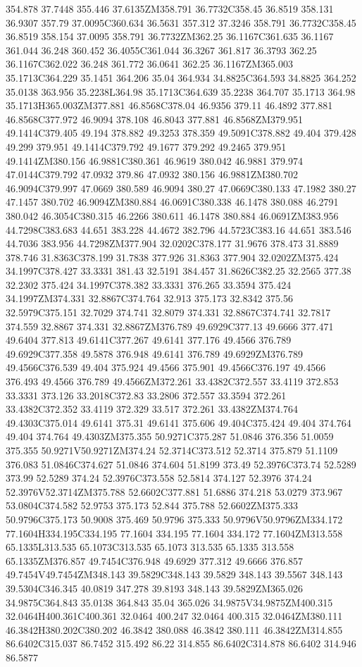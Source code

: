 354.878 37.7448 355.446 37.6135ZM358.791 36.7732C358.45 36.8519 358.131 36.9307 357.79 37.0095C360.634 36.5631 357.312 37.3246 358.791 36.7732C358.45 36.8519 358.154 37.0095 358.791 36.7732ZM362.25 36.1167C361.635 36.1167 361.044 36.248 360.452 36.4055C361.044 36.3267 361.817 36.3793 362.25 36.1167C362.022 36.248 361.772 36.0641 362.25 36.1167ZM365.003 35.1713C364.229 35.1451 364.206 35.04 364.934 34.8825C364.593 34.8825 364.252 35.0138 363.956 35.2238L364.98 35.1713C364.639 35.2238 364.707 35.1713 364.98 35.1713H365.003ZM377.881 46.8568C378.04 46.9356 379.11 46.4892 377.881 46.8568C377.972 46.9094 378.108 46.8043 377.881 46.8568ZM379.951 49.1414C379.405 49.194 378.882 49.3253 378.359 49.5091C378.882 49.404 379.428 49.299 379.951 49.1414C379.792 49.1677 379.292 49.2465 379.951 49.1414ZM380.156 46.9881C380.361 46.9619 380.042 46.9881 379.974 47.0144C379.792 47.0932 379.86 47.0932 380.156 46.9881ZM380.702 46.9094C379.997 47.0669 380.589 46.9094 380.27 47.0669C380.133 47.1982 380.27 47.1457 380.702 46.9094ZM380.884 46.0691C380.338 46.1478 380.088 46.2791 380.042 46.3054C380.315 46.2266 380.611 46.1478 380.884 46.0691ZM383.956 44.7298C383.683 44.651 383.228 44.4672 382.796 44.5723C383.16 44.651 383.546 44.7036 383.956 44.7298ZM377.904 32.0202C378.177 31.9676 378.473 31.8889 378.746 31.8363C378.199 31.7838 377.926 31.8363 377.904 32.0202ZM375.424 34.1997C378.427 33.3331 381.43 32.5191 384.457 31.8626C382.25 32.2565 377.38 32.2302 375.424 34.1997C378.382 33.3331 376.265 33.3594 375.424 34.1997ZM374.331 32.8867C374.764 32.913 375.173 32.8342 375.56 32.5979C375.151 32.7029 374.741 32.8079 374.331 32.8867C374.741 32.7817 374.559 32.8867 374.331 32.8867ZM376.789 49.6929C377.13 49.6666 377.471 49.6404 377.813 49.6141C377.267 49.6141 377.176 49.4566 376.789 49.6929C377.358 49.5878 376.948 49.6141 376.789 49.6929ZM376.789 49.4566C376.539 49.404 375.924 49.4566 375.901 49.4566C376.197 49.4566 376.493 49.4566 376.789 49.4566ZM372.261 33.4382C372.557 33.4119 372.853 33.3331 373.126 33.2018C372.83 33.2806 372.557 33.3594 372.261 33.4382C372.352 33.4119 372.329 33.517 372.261 33.4382ZM374.764 49.4303C375.014 49.6141 375.31 49.6141 375.606 49.404C375.424 49.404 374.764 49.404 374.764 49.4303ZM375.355 50.9271C375.287 51.0846 376.356 51.0059 375.355 50.9271V50.9271ZM374.24 52.3714C373.512 52.3714 375.879 51.1109 376.083 51.0846C374.627 51.0846 374.604 51.8199 373.49 52.3976C373.74 52.5289 373.99 52.5289 374.24 52.3976C373.558 52.5814 374.127 52.3976 374.24 52.3976V52.3714ZM375.788 52.6602C377.881 51.6886 374.218 53.0279 373.967 53.0804C374.582 52.9753 375.173 52.844 375.788 52.6602ZM375.333 50.9796C375.173 50.9008 375.469 50.9796 375.333 50.9796V50.9796ZM334.172 77.1604H334.195C334.195 77.1604 334.195 77.1604 334.172 77.1604ZM313.558 65.1335L313.535 65.1073C313.535 65.1073 313.535 65.1335 313.558 65.1335ZM376.857 49.7454C376.948 49.6929 377.312 49.6666 376.857 49.7454V49.7454ZM348.143 39.5829C348.143 39.5829 348.143 39.5567 348.143 39.5304C346.345 40.0819 347.278 39.8193 348.143 39.5829ZM365.026 34.9875C364.843 35.0138 364.843 35.04 365.026 34.9875V34.9875ZM400.315 32.0464H400.361C400.361 32.0464 400.247 32.0464 400.315 32.0464ZM380.111 46.3842H380.202C380.202 46.3842 380.088 46.3842 380.111 46.3842ZM314.855 86.6402C315.037 86.7452 315.492 86.22 314.855 86.6402C314.878 86.6402 314.946 86.5877 